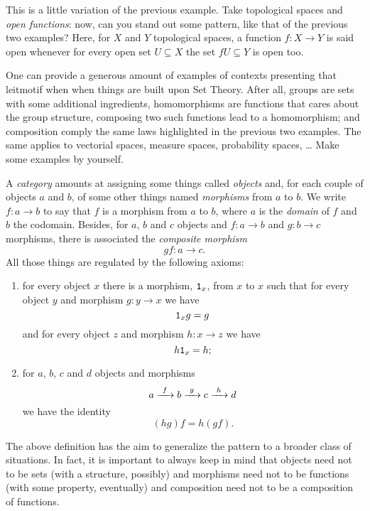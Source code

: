 \begin{exercise}
This is a little variation of the previous example. Take topological spaces and {\em open functions}: now, can you stand out some pattern, like that of the previous two examples? Here, for \(X\) and \(Y\) topological spaces, a function \(f : X \to Y\) is said open whenever for every open set \(U \subseteq X\) the set \(f U \subseteq Y\) is open too. 
\end{exercise}

\begin{exercise}
One can provide a generous amount of examples of contexts presenting that leitmotif when when things are built upon Set Theory. After all, groups are sets with some additional ingredients, homomorphisms are functions that cares about the group structure, composing two such functions lead to a homomorphism; and composition comply the same laws highlighted in the previous two examples. The same applies to vectorial spaces, measure spaces, probability spaces, \dots{} Make some examples by yourself.
\end{exercise}

\begin{definition}[Categories]
A {\em category} amounts at assigning some things called {\em objects} and, for each couple of objects \(a\) and \(b\), of some other things named {\em morphisms} from \(a\) to \(b\). We write \(f : a \to b\) to say that \(f\) is a morphism from \(a\) to \(b\), where \(a\) is the {\em domain} of \(f\) and \(b\) the codomain. Besides, for \(a\), \(b\) and \(c\) objects and \(f : a \to b\) and \(g : b \to c\) morphisms, there is associated the {\em composite morphism}
\[gf : a \to c .\]
All those things are regulated by the following axioms:
\begin{enumerate}
\item for every object \(x\) there is a morphism, \(\mathtt 1_x\), from \(x\) to \(x\) such that for every object \(y\) and morphism \(g : y \to x\) we have
\[\mathtt 1_x g = g\]
and for every object \(z\) and morphism \(h : x \to z\) we have
\[h \mathtt 1_x = h ;\]
\item for \(a\), \(b\), \(c\) and \(d\) objects and morphisms
\[a \xrightarrow{\ f\ } b \xrightarrow{\ g\ } c \xrightarrow{\ h\ } d\]
we have the identity
\[(h g) f = h (g f) .\]
\end{enumerate}
\end{definition}

The above definition has the aim to generalize the  pattern to a broader class of situations. In fact, it is important to always keep in mind that objects need not to be sets (with a structure, possibly) and morphisms need not to be functions (with some property, eventually) and composition need not to be a composition of functions.

